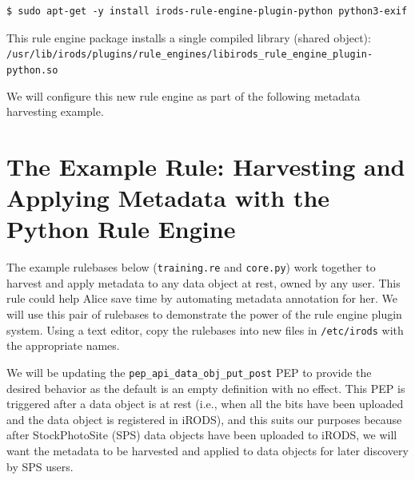 \documentclass[10pt,oneside]{memoir}
\begin{document}
\begin{lstlisting}
$ sudo apt-get -y install irods-rule-engine-plugin-python python3-exif
\end{lstlisting}

This rule engine package installs a single compiled library (shared object): \\ \texttt{/usr/lib/irods/plugins/rule\_engines/libirods\_rule\_engine\_plugin-python.so}

We will configure this new rule engine as part of the following metadata harvesting example.

\section{The Example Rule: Harvesting and Applying Metadata with the Python Rule Engine}

The example rulebases below (\texttt{training.re} and \texttt{core.py}) work together to harvest and apply metadata to any data object at rest, owned by any user. This rule could help Alice save time by automating metadata annotation for her. We will use this pair of rulebases to demonstrate the power of the rule engine plugin system. Using a text editor, copy the rulebases into new files in \texttt{/etc/irods} with the appropriate names.

\vspace{5mm}
\begin{lrbox}{\lstTrainingRuleBase}

\end{lrbox}
\href{https://raw.githubusercontent.com/irods/irods_training/ugm2026/beginner/training.re}{\usebox{\lstTrainingRuleBase}}

\vspace{5mm}
\begin{lrbox}{\lstPythonRulebase}

\end{lrbox}
\href{https://raw.githubusercontent.com/irods/irods_training/ugm2026/beginner/core.py}{\usebox{\lstPythonRulebase}}

We will be updating the \texttt{pep\_api\_data\_obj\_put\_post} PEP to provide the desired behavior as the default is an empty definition with no effect.  This PEP is triggered after a data object is at rest (i.e., when all the bits have been uploaded and the data object is registered in iRODS), and this suits our purposes because after StockPhotoSite (SPS) data objects have been uploaded to iRODS, we will want the metadata to be harvested and applied to data objects for later discovery by SPS users.
\end{document}
